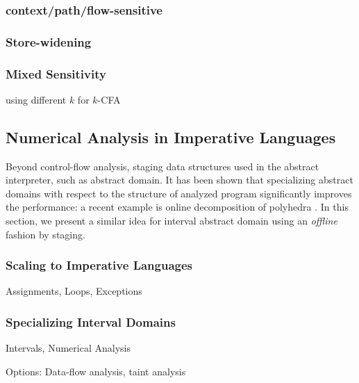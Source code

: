 \subsubsection{context/path/flow-sensitive}

\subsubsection{Store-widening}

\subsubsection{Mixed Sensitivity}

using different $k$ for $k$-CFA


\subsection{Numerical Analysis in Imperative Languages} \label{cases_imp}

Beyond control-flow analysis, staging data structures used in the abstract interpreter, such as abstract domain.
It has been shown that specializing abstract domains with respect to the structure of analyzed program significantly 
improves the performance: a recent example is online decomposition of polyhedra \cite{DBLP:conf/popl/SinghPV17}.
In this section, we present a similar idea for interval abstract domain using an \textit{offline} fashion by staging.

\subsubsection{Scaling to Imperative Languages}

Assignments, Loops, Exceptions

\subsubsection{Specializing Interval Domains}

Intervals, Numerical Analysis

Options: Data-flow analysis, taint analysis
